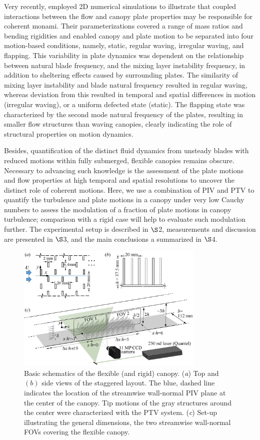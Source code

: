 \documentclass[lineno,authoryear]{FLO_v1}%
\theoremstyle{definition}
\begin{document}
Very recently, \citet{o2019dynamic} employed 2D numerical simulations to illustrate that coupled interactions between the flow and canopy plate properties may be responsible for coherent monami. Their parameterizations covered a range of mass ratios and bending rigidities and enabled canopy and plate motion to be separated into four motion-based conditions, namely, static, regular waving, irregular waving, and flapping. This variability in plate dynamics was dependent on the relationship between natural blade frequency, and the mixing layer instability frequency, in addition to sheltering effects caused by surrounding plates. The similarity of mixing layer instability and blade natural frequency resulted in regular waving, whereas deviation from this resulted in temporal and spatial differences in motion (irregular waving), or a uniform defected state (static). The flapping state was characterized by the second mode natural frequency of the plates, resulting in smaller flow structures than waving canopies, clearly indicating the role of structural properties on motion dynamics.


Besides, quantification of the distinct fluid dynamics from unsteady blades with reduced motions within fully submerged, flexible canopies remains obscure. Necessary to advancing such knowledge is the assessment of the plate motions and flow properties at high temporal and spatial resolutions to uncover the distinct role of coherent motions. Here, we use a combination of PIV and PTV to quantify the turbulence and plate motions in a canopy under very low Cauchy numbers to assess the modulation of a fraction of plate motions in canopy turbulence; comparison with a rigid case will help to evaluate such modulation further.  The experimental setup is described in $\S$2, measurements and discussion are presented in $\S$3, and the main conclusions a summarized in $\S$4.


\begin{figure}
	\centerline{\includegraphics[width=0.8\textwidth]{fig1}}
	\caption{Basic schematics of the flexible (and rigid) canopy. (\textit{a}) Top and $(b)$ side views of the staggered layout. The blue, dashed line indicates the location of the streamwise wall-normal PIV plane at the center of the canopy. Tip motions of the gray structures around the center were characterized with the PTV system.  (\textit{c}) Set-up illustrating the general dimensions, the two streamwise wall-normal FOVs covering the flexible canopy.}
	\label{canopy_model}
\end{figure}
\end{document}
